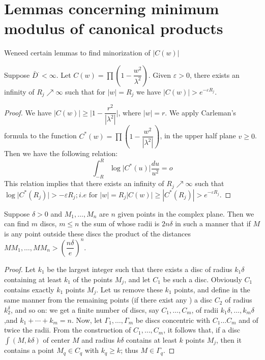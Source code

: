 \chapter[Lemmas concerning minimum modulus of...]{Lemmas concerning minimum modulus of canonical products}\label{chap14} %

We\pageoriginale need certain lemmas to find minorization of $\big| C (w)\big|$

\begin{lem}\label{chap14:lem1} %
 Suppose $\bar{D}^. < \infty$. Let $C (w) = \prod \left(1 - \dfrac {w^2}
 {\lambda^2}\right)$. Given $\varepsilon > 0$, there exists an infinity of
 $R_j \nearrow \infty$ such that for $|w| =R_j$ we have $\big| C
 (w) \big| > e^{- \varepsilon R_j}$. 
\end{lem}

\begin{proof}
 We have $\bigg| C (w)\bigg| \ge \bigg| 1 - \dfrac
 {r^2}{|\lambda^2|}\bigg|$, where $|w| = r$. We apply Carleman's
 formula to the function $C^* (w) = \prod \left(1 - \dfrac {w^2}
 {|\lambda^2|}\right)$, in the upper half plane $v \ge 0$. Then we have
 the following relation: 
 \begin{equation}
 \int^R_{-R} \log \big| C^* (u) \big| \frac{du} {u^2} = o
 \tag{1}\label{chap14:eq1} 
 \end{equation}
 This relation implies that there exists an infinity of $R_j \nearrow
 \infty$ such that $\log \big| C^* (R_j)\big| > - \varepsilon R_j ;
 i.e \text{ for } |w| = R_j |C (w) | \ge |C^* (R_j)| > e^{-
 \varepsilon R_j}$. 
\end{proof}

\begin{lem}[H. Cartan]\label{chap14:lem2}
 Suppose $\delta > 0$ and $M_1, \ldots,M_n$ are $n$
 given points in the complex plane. Then we can find $m$ discs, $m
 \le n$ the sum of whose radii is $2n \delta$ in such a manner that
 if $M$ is any point outside these discs the product of the
 distances $MM_1, \ldots, MM_n > \left(\dfrac {n \delta} {e}\right)^n$. 
\end{lem}

\begin{proof}
 Let $k_1$ be the largest integer such that there exists a disc of
 radius $k_1 \delta$ containing at least $k_1$ of the points $M_j$,
 and let $C_1$ be such a disc. Obviously $C_1$ contains exactly $k_1$
 points $M_j$. Let us remove these $k_1$ points, and define in the
 same manner from the remaining points (if there exist any ) a disc $C_2$
 of radius $k^\delta_2$, and so on: we get a finite number of discs,
 say $C_1, \ldots,C_m$, of radii $k_1 \delta, \ldots,k_m \delta$,\pageoriginale and
 $k_1 +\cdots+ k_m=n$. Now, let $\Gamma_1, \ldots, \Gamma_m$ be discs
 concentric with $C_1\ldots C_m$ and of twice the radii. From the 
 construction of $C_1, \ldots,C_m$, it follows that, if a disc $\int
 (M, k \delta)$ of center $M$ and radius $k \delta$ contains at
 least $k$ points $M_j$, then it contains a point $M_q \in
 C_q$ with $k_q \ge k$; thus $M \in \Gamma_q$. 
\end{proof}

